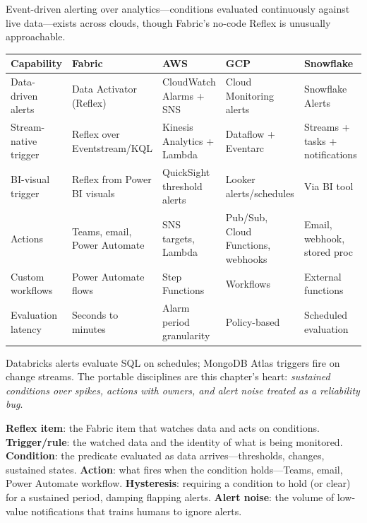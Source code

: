 \begin{crosscloud}
Event-driven alerting over analytics---conditions evaluated continuously against live data---exists across clouds, though Fabric's no-code Reflex is unusually approachable.

\vspace{2mm}
{\footnotesize
\begin{tabular}{@{}p{2.8cm}p{3.2cm}p{3.2cm}p{3.2cm}p{3.2cm}@{}}
\toprule
\textbf{Capability} & \textbf{Fabric} & \textbf{AWS} & \textbf{GCP} & \textbf{Snowflake} \\
\midrule
Data-driven alerts & Data Activator (Reflex) & CloudWatch Alarms + SNS & Cloud Monitoring alerts & Snowflake Alerts \\
Stream-native trigger & Reflex over Eventstream/KQL & Kinesis Analytics + Lambda & Dataflow + Eventarc & Streams + tasks + notifications \\
BI-visual trigger & Reflex from Power BI visuals & QuickSight threshold alerts & Looker alerts/schedules & Via BI tool \\
Actions & Teams, email, Power Automate & SNS targets, Lambda & Pub/Sub, Cloud Functions, webhooks & Email, webhook, stored proc \\
Custom workflows & Power Automate flows & Step Functions & Workflows & External functions \\
Evaluation latency & Seconds to minutes & Alarm period granularity & Policy-based & Scheduled evaluation \\
\bottomrule
\end{tabular}}

\vspace{1mm}
Databricks alerts evaluate SQL on schedules; MongoDB Atlas triggers fire on change streams. The portable disciplines are this chapter's heart: \emph{sustained conditions over spikes, actions with owners, and alert noise treated as a reliability bug}.
\end{crosscloud}

\begin{keyterms}
\textbf{Reflex item}: the Fabric item that watches data and acts on conditions. \quad
\textbf{Trigger/rule}: the watched data and the identity of what is being monitored. \quad
\textbf{Condition}: the predicate evaluated as data arrives---thresholds, changes, sustained states. \quad
\textbf{Action}: what fires when the condition holds---Teams, email, Power Automate workflow. \quad
\textbf{Hysteresis}: requiring a condition to hold (or clear) for a sustained period, damping flapping alerts. \quad
\textbf{Alert noise}: the volume of low-value notifications that trains humans to ignore alerts.
\end{keyterms}

